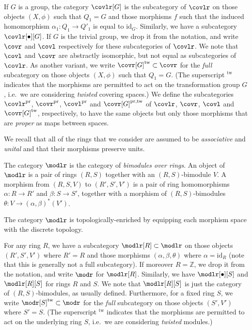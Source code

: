 \documentclass[AHL,Unicode,published]{cedram}
\newcommand{\pr}{\ensuremath{\mathrm{pr}}}
\newcommand{\id}{\mathrm{id}}
\newcommand{\tw}{\mathrm{tw}}
\newcommand{\bZ}{\mathbb{Z}}
\begin{document}
\begin{defi}
If $G$ is a group, the category $\covlr[G]$ is the subcategory of $\covlr$ on those objects $(X,\phi)$ such that $Q_{1} = G$ and those morphisms $f$ such that the induced homomorphism $\alpha_{1}\colon Q_{1} \to Q'_{1}$ is equal to $\id_G$. Similarly, we have a subcategory $\covlr[\bullet][G]$. If $G$ is the trivial group, we drop it from the notation, and write $\covr$ and $\covl$ respectively for these subcategories of $\covlr$. We note that $\covl$ and $\covr$ are abstractly isomorphic, but not equal as subcategories of $\covlr$. As another variant, we write $\covr[G]^{\tw} \subset \covr$ for the \emph{full} subcategory on those objects $(X,\phi)$ such that $Q_{1} = G$. (The superscript ${}^{\tw}$ indicates that the morphisms are permitted to act on the transformation group $G$, i.e.~we are considering \emph{twisted} covering spaces.) We define the subcategories $\covlr^{\pr}$, $\covr^{\pr}$, $\covl^{\pr}$ and $\covr[G]^{\pr,\tw}$ of $\covlr$, $\covr$, $\covl$ and $\covr[G]^{\tw}$, respectively, to have the same objects but only those morphisms that are \emph{proper} as maps between spaces.
\end{defi}

We recall that all of the rings that we consider are assumed to be \emph{associative} and \emph{unital} and that their morphisms preserve units.

\begin{defi}\label{def:bimodule_category}
The category $\modlr$ is the category of \emph{bimodules over rings}. An object of $\modlr$ is a pair of rings $(R,S)$ together with an $(R,S)$-bimodule $V$. A morphism from $(R,S,V)$ to $(R',S',V')$ is a pair of ring homomorphisms $\alpha \colon R \to R'$ and $\beta \colon S \to S'$, together with a morphism of $(R,S)$-bimodules $\theta \colon V \to (\alpha,\beta)^{*} (V')$.

The category $\modlr$ is topologically-enriched by equipping each morphism space with the discrete topology.

For any ring $R$, we have a subcategory $\modlr[R] \subset \modlr$ on those objects $(R',S',V')$ where $R'=R$ and those morphisms $(\alpha,\beta,\theta)$ where $\alpha = \id_R$ (note that this is generally not a full subcategory). If moreover $R=\bZ$, we drop it from the notation, and write $\modr$ for $\modlr[R]$. Similarly, we have $\modlr[\bullet][S]$ and $\modlr[R][S]$ for rings $R$ and $S$. We note that $\modlr[R][S]$ is just the category of $(R,S)$-bimodules, as usually defined. Furthermore, for a fixed ring $S$, we write $\modr[S]^{\tw} \subset \modr$ for the \emph{full} subcategory on those objects $(S',V')$ where $S'=S$. (The superscript ${}^{\tw}$ indicates that the morphisms are permitted to act on the underlying ring $S$, i.e.~we are considering \emph{twisted} modules.)
\end{defi}
\end{document}

